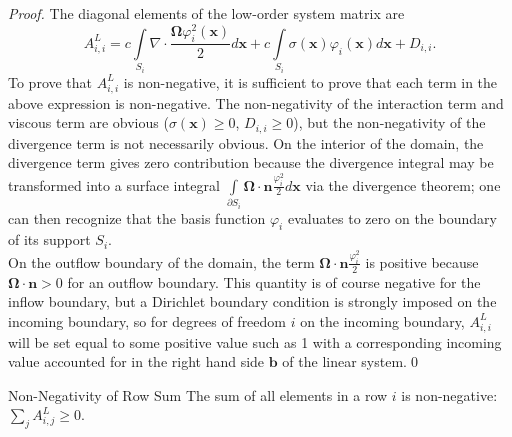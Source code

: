 \begin{proof}
The diagonal elements  of the low-order system matrix are
\[
	A^L_{i,i} = c\int\limits_{S_{i}}\nabla\cdot
   \frac{\mathbf{\Omega}\varphi_i^2(\mathbf{x})}{2} d\mathbf{x} 
      + c\int\limits_{S_{i}}\sigma(\mathbf{x})\varphi_i(\mathbf{x})d\mathbf{x}
      + D_{i,i}.
\]
To prove that $A^L_{i,i}$ is non-negative, it is sufficient to prove that
each term in the above expression is non-negative. The non-negativity of
the interaction term and viscous term are obvious ($\sigma(\mathbf{x}) \ge 0$,
$D_{i,i}\geq 0$), but
the non-negativity of the divergence term is not necessarily obvious. On the interior of
the domain, the divergence term gives zero contribution because the divergence integral may
be transformed into a surface integral $\int\limits_{\partial S_{i}}
\mathbf{\Omega}\cdot\mathbf{n}\frac{\varphi_i^2}{2} d\mathbf{x}$
via the divergence theorem; one can then recognize that
the basis function $\varphi_i$ evaluates to zero on the boundary of its support $S_{i}$.\\
On the outflow boundary of the domain, the term $\mathbf{\Omega}\cdot\mathbf{n}
\frac{\varphi_i^2}{2}$ is positive because $\mathbf{\Omega}\cdot\mathbf{n} >0$
for an outflow boundary. This quantity is of course negative for the inflow boundary,
but a Dirichlet boundary condition is strongly imposed on the incoming boundary, so
for degrees of freedom $i$ on the incoming boundary, $A^L_{i,i}$ will be set equal
to some positive value such as 1 with a corresponding incoming value
accounted for in the right hand side $\mathbf{b}$ of the linear system.\qed
\end{proof}
\begin{lemma}{Non-Negativity of Row Sum}
   The sum of all elements in a row $i$ is non-negative: $\sum\limits_j A^L_{i,j} \ge 0$.
\end{lemma}

